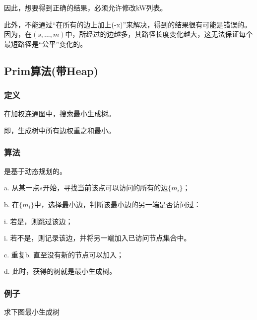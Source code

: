 \documentclass[a4paper]{article}    %
\begin{document}
因此，想要得到正确的结果，必须允许修改kW列表。

此外，不能通过“在所有的边上加上(-x)”来解决，得到的结果很有可能是错误的。因为，在$(s,...,m)$中，所经过的边越多，其路径长度变化越大，这无法保证每个最短路径是“公平”变化的。

\subsection{Prim算法(带Heap)}

\subsubsection{定义}

在加权连通图中，搜索最小生成树。

即，生成树中所有边权重之和最小。

\subsubsection{算法} 

\noindent 是基于动态规划的。

a. 从某一点$s$开始，寻找当前该点可以访问的所有的边$\{m_i\}$；

b. 在$\{m_i\}$中，选择最小边，判断该最小边的另一端是否访问过：

\indent\indent i. 若是，则跳过该边；

\indent\indent i. 若不是，则记录该边，并将另一端加入已访问节点集合中。

c. 重复b. 直至没有新的节点可以加入；

d. 此时，获得的树就是最小生成树。

\subsubsection{例子}

\noindent 求下图最小生成树
\end{document}
